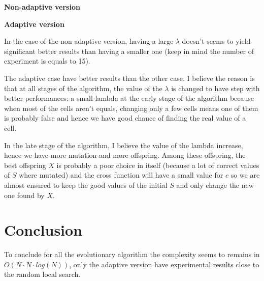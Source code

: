 \documentclass[12pt]{article}
\theoremstyle{definition}
\theoremstyle{plain}
\theoremstyle{remark}
\begin{document}
\textbf{Non-adaptive version}


\textbf{Adaptive version}


In the case of the non-adaptive version, having a large $\lambda$ doesn't seems to yield significant better results than having a smaller one (keep in mind the number of experiment is equals to 15).

The adaptive case have better results than the other case. I believe the reason is that at all stages of the algorithm, the value of the $\lambda$ is changed to have step with better performances: a small lambda at the early stage of the algorithm because when most of the cells aren't equals, changing only a few cells means one of them is probably false and hence we have good chance of finding the real value of a cell.

In the late stage of the algorithm, I believe the value of the lambda increase, hence we have more mutation and more offspring. Among these offspring, the best offspring $X$ is probably a poor choice in itself (because a lot of correct values of $S$ where mutated) and the cross function will have a small value for $c$ so we are almost ensured to keep the good values of the initial $S$ and only change the new one found by $X$.

\section{Conclusion}
To conclude for all the evolutionary algorithm the complexity seems to remains in $O(N \cdot N \cdot log(N))$, only the adaptive version have experimental results close to the random local search.
\end{document}
